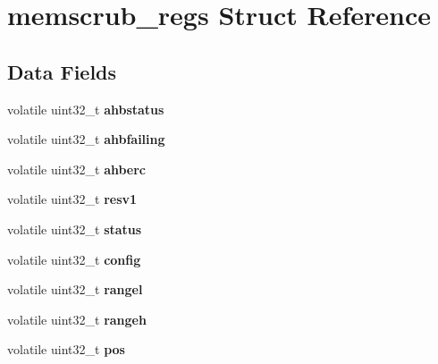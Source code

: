 \hypertarget{structmemscrub__regs}{}\section{memscrub\+\_\+regs Struct Reference}
\label{structmemscrub__regs}
\subsection*{Data Fields}
\begin{DoxyCompactItemize}
\item 
\mbox{\label{structmemscrub__regs_a6103835ed33485f3e3094cd3296663f9}} 
volatile uint32\+\_\+t {\bfseries ahbstatus}
\item 
\mbox{\label{structmemscrub__regs_a99982f81ffc554a17c85138203f37b34}} 
volatile uint32\+\_\+t {\bfseries ahbfailing}
\item 
\mbox{\label{structmemscrub__regs_aa1526e2b5bbef2cc3094d66d96d963e2}} 
volatile uint32\+\_\+t {\bfseries ahberc}
\item 
\mbox{\label{structmemscrub__regs_a6e1ca29f6d7a47474573778ac461a729}} 
volatile uint32\+\_\+t {\bfseries resv1}
\item 
\mbox{\label{structmemscrub__regs_a0250f4cb4cf19cae0e78b20aa35318ac}} 
volatile uint32\+\_\+t {\bfseries status}
\item 
\mbox{\label{structmemscrub__regs_af14a652439f570f4765bdf74d8d7f3c6}} 
volatile uint32\+\_\+t {\bfseries config}
\item 
\mbox{\label{structmemscrub__regs_a548d754b58c4a7ad60a8ab888d6d3716}} 
volatile uint32\+\_\+t {\bfseries rangel}
\item 
\mbox{\label{structmemscrub__regs_a4ab94442466564af935f90e4a2e53ad3}} 
volatile uint32\+\_\+t {\bfseries rangeh}
\item 
\mbox{\label{structmemscrub__regs_a95491d0088481efdbcbecd731fc9ccfb}} 
volatile uint32\+\_\+t {\bfseries pos}

\end{DoxyCompactItemize}

